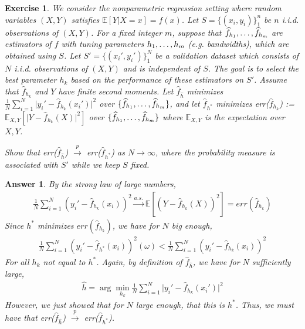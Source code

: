 \documentclass[12pt]{article}
\theoremstyle{colon}
\newtheorem{exercise}{Exercise}
\newtheorem*{answer}{Answer}
\begin{document}
\begin{exercise}
  We consider the nonparametric regression setting where random variables $(X,Y)$ satisfies $\mathbb{E}[Y | X = x] = f(x)$. Let $S = \{ (x_i, y_i) \}_1^n$ be $n$ i.i.d. observations of $(X,Y)$. For a fixed integer $m$, suppose that $\widehat{f}_{h_1}, \mathellipsis, \widehat{f}_{h_m}$ are estimators of $f$ with tuning parameters $h_1, \mathellipsis, h_m$ (e.g. bandwidths), which are obtained using $S$. Let $S' = \{ (x_i', y_i') \}_1^N$ be a \textit{validation} dataset which consists of $N$ i.i.d. observations of $(X,Y)$ and is independent of $S$. The goal is to select the best parameter $h_k$ based on the performance of these estimators on $S'$. Assume that $\widehat{f}_{h_k}$ and $Y$ have finite second moments. Let $\widehat{f}_{\widehat{h}}$ minimizes $\frac{1}{N} \sum_{i=1}^N \lvert y_i' - \widehat{f}_{h_k}(x_i') \rvert^2$ over $\{ \widehat{f}_{h_1}, \mathellipsis, \widehat{f}_{h_m} \}$, and let $\widehat{f}_{h^*}$ minimizes err($\widehat{f}_{h_k}$) := $\mathbb{E}_{X,Y}[\lvert Y - \widehat{f}_{h_k}(X) \rvert^2]$ over $\{ \widehat{f}_{h_1}, \mathellipsis, \widehat{f}_{h_m} \}$ where $\mathbb{E}_{X,Y}$ is the expectation over $X, Y$.

  Show that err($\widehat{f}_{\widehat{h}}$) $\xrightarrow{p}$ err($\widehat{f}_{h^*}$) as $N \rightarrow \infty$, where the probability measure is associated with $S'$ while we keep $S$ fixed.
\end{exercise}

\begin{answer}
  By the strong law of large numbers,
  \begin{gather*}
    \frac{1}{N} \sum_{i=1}^N (y_i' - \widehat{f}_{h_k}(x_i))^2 \xrightarrow{a.s.} \mathbb{E}[(Y - \widehat{f}_{h_k}(X))^2 ] = err(\widehat{f}_{h_k})
  \end{gather*}
  Since $h^*$ minimizes $err(\widehat{f}_{h_k})$, we have for $N$ big enough,
  \begin{gather*}
    \frac{1}{N} \sum_{i=1}^N (y_i' - \widehat{f}_{h^*}(x_i))^2 (\omega) < \frac{1}{N} \sum_{i=1}^N (y_i' - \widehat{f}_{h_k}(x_i))^2
  \end{gather*}
  For all $h_k$ not equal to $h^*$. Again, by definition of $\widehat{f}_{\widehat{h}}$, we have for $N$ sufficiently large,
  \begin{gather*}
    \widehat{h} = \arg \min_{h_k} \frac{1}{N} \sum_{i=1}^N \lvert y_i' - \widehat{f}_{h_k}(x_i') \rvert^2
  \end{gather*}
  However, we just showed that for $N$ large enough, that this is $h^*$. Thus, we must have that err($\widehat{f}_{\widehat{h}}$) $\xrightarrow{p}$ err($\widehat{f}_{h^*}$).
\end{answer}
\end{document}
